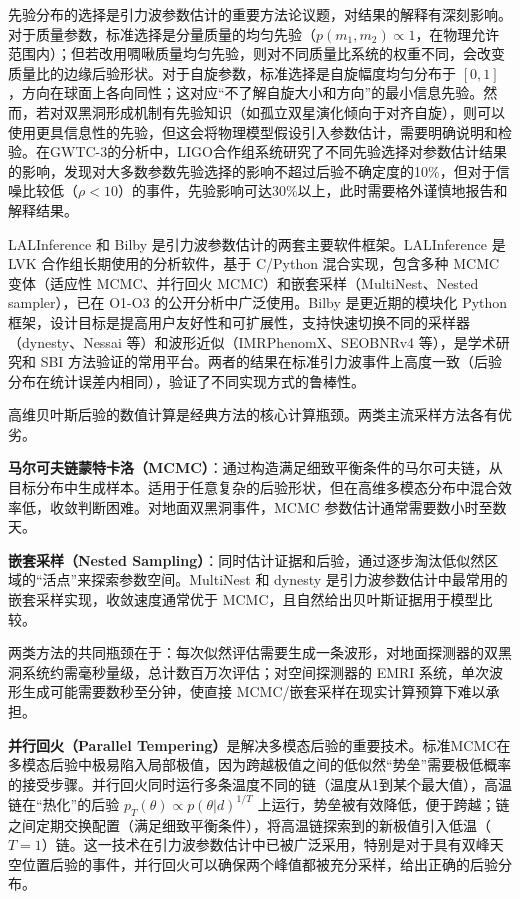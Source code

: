 先验分布的选择是引力波参数估计的重要方法论议题，对结果的解释有深刻影响。对于质量参数，标准选择是分量质量的均匀先验（$p(m_1,m_2) \propto 1$，在物理允许范围内）；但若改用啁啾质量均匀先验，则对不同质量比系统的权重不同，会改变质量比的边缘后验形状。对于自旋参数，标准选择是自旋幅度均匀分布于 $[0,1]$，方向在球面上各向同性；这对应“不了解自旋大小和方向”的最小信息先验。然而，若对双黑洞形成机制有先验知识（如孤立双星演化倾向于对齐自旋），则可以使用更具信息性的先验，但这会将物理模型假设引入参数估计，需要明确说明和检验。在GWTC-3的分析中，LIGO合作组系统研究了不同先验选择对参数估计结果的影响，发现对大多数参数先验选择的影响不超过后验不确定度的10\%，但对于信噪比较低（$\rho < 10$）的事件，先验影响可达30\%以上，此时需要格外谨慎地报告和解释结果。

LALInference 和 Bilby 是引力波参数估计的两套主要软件框架。LALInference 是 LVK 合作组长期使用的分析软件，基于 C/Python 混合实现，包含多种 MCMC 变体（适应性 MCMC、并行回火 MCMC）和嵌套采样（MultiNest、Nested sampler），已在 O1-O3 的公开分析中广泛使用。Bilby 是更近期的模块化 Python 框架，设计目标是提高用户友好性和可扩展性，支持快速切换不同的采样器（dynesty、Nessai 等）和波形近似（IMRPhenomX、SEOBNRv4 等），是学术研究和 SBI 方法验证的常用平台。两者的结果在标准引力波事件上高度一致（后验分布在统计误差内相同），验证了不同实现方式的鲁棒性。

高维贝叶斯后验的数值计算是经典方法的核心计算瓶颈。两类主流采样方法各有优劣。

\textbf{马尔可夫链蒙特卡洛（MCMC）}：通过构造满足细致平衡条件的马尔可夫链，从目标分布中生成样本。适用于任意复杂的后验形状，但在高维多模态分布中混合效率低，收敛判断困难。对地面双黑洞事件，MCMC 参数估计通常需要数小时至数天。

\textbf{嵌套采样（Nested Sampling）}：同时估计证据和后验，通过逐步淘汰低似然区域的“活点”来探索参数空间。MultiNest 和 dynesty 是引力波参数估计中最常用的嵌套采样实现，收敛速度通常优于 MCMC，且自然给出贝叶斯证据用于模型比较。

两类方法的共同瓶颈在于：每次似然评估需要生成一条波形，对地面探测器的双黑洞系统约需毫秒量级，总计数百万次评估；对空间探测器的 EMRI 系统，单次波形生成可能需要数秒至分钟，使直接 MCMC/嵌套采样在现实计算预算下难以承担。

\textbf{并行回火（Parallel Tempering）}是解决多模态后验的重要技术。标准MCMC在多模态后验中极易陷入局部极值，因为跨越极值之间的低似然“势垒”需要极低概率的接受步骤。并行回火同时运行多条温度不同的链（温度从1到某个最大值），高温链在“热化”的后验 $p_T(\theta) \propto p(\theta|d)^{1/T}$ 上运行，势垒被有效降低，便于跨越；链之间定期交换配置（满足细致平衡条件），将高温链探索到的新极值引入低温（$T=1$）链。这一技术在引力波参数估计中已被广泛采用，特别是对于具有双峰天空位置后验的事件，并行回火可以确保两个峰值都被充分采样，给出正确的后验分布。

